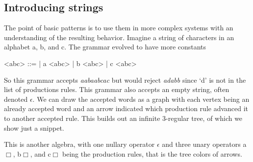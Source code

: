\subsection{Introducing strings}
The point of basic patterns is to use them in more complex systems
with an understanding of the resulting behavior.  Imagine a string 
of characters in an alphabet a, b, and c.  The grammar evolved to 
have more constants 
\begin{center}
\begin{gcode}[]
<abc> ::=  
       | a <abc> 
       | b <abc>
       | c <abc> 
\end{gcode}
\end{center}
So this grammar accepts \emph{aabaabcac} 
but would reject \emph{adabb} since `d' is not in the list of productions 
rules.  This grammar also accepts an empty string, often denoted 
$\epsilon$.  We can draw the accepted words as a graph with each vertex 
being an already accepted word and an arrow indicated which production rule 
advanced it to another accepted rule.  This builds out an infinite 
3-regular tree, of which we show just a snippet.
\begin{center}
\end{center}
This is another algebra, with one nullary operator 
$\epsilon$ and three unary operators {\color{BrickRed}a$\Box$}, 
{\color{PineGreen}b$\Box$}, and {\color{RoyalBlue}c$\Box$}
being the production rules, that is the tree colors of arrows.

